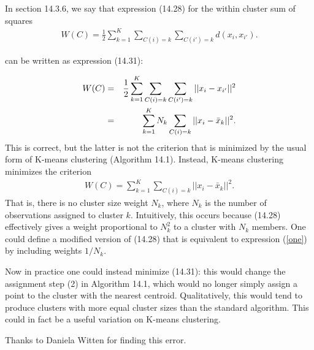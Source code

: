 
In section 14.3.6, 
 we say that expression (14.28) for the within cluster sum of squares
\begin{eqnarray*}
W(C)=\frac{1}{2}\sum_{k=1}^{K}\sum_{C(i)=k}\sum_{ C(i')=k} d(x_{i},x_{i'}).
\end{eqnarray*}  

can be written as expression (14.31):

\begin{eqnarray*}
W(C)  &=&\frac{1}{2}\sum_{k=1}^{K}\sum_{C(i)=k}\sum_{ C(i')=k}||x_i-x_{i'}||^2\cr
&=&\sum_{k=1}^{K}N_k\sum_{C(i)=k}||x_i-\bar x_k||^2.
\end{eqnarray*}
This is correct, but the latter is not the criterion that is minimized
by the usual
form of K-means clustering (Algorithm 14.1). Instead,
 K-means clustering minimizes the criterion
\begin{eqnarray}
W(C) =
\sum_{k=1}^{K}\sum_{C(i)=k}||x_i-\bar x_k||^2.
\label{one}
\end{eqnarray}
That is, there is no cluster size weight $N_k$,
where $N_k$ is the number of observations assigned to cluster $k$.
Intuitively, this occurs because (14.28) effectively gives a  weight
proportional to $N_k^2$ to  a cluster with $N_k$ members.
One could define a  modified version of (14.28)  that is  equivalent to
expression (\ref{one}) by including weights $1/N_k$.

Now in practice one could instead minimize (14.31): this would change
the assignment step (2) in Algorithm 14.1, which would no longer
simply assign a point to the cluster with the nearest centroid.
 Qualitatively, this would tend to
produce clusters with more equal cluster sizes than the standard
algorithm. This could in fact be a useful variation
on K-means clustering.

Thanks to Daniela Witten for finding this error.





